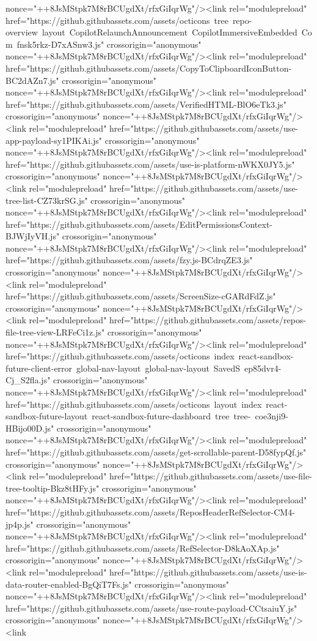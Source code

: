 nonce="++8JsMStpk7M8rBCUgdXt/rfxGiIqrWg"/><link rel="modulepreload" href="https://github.githubassets.com/assets/octicons~tree~repo-overview~layout~CopilotRelaunchAnnouncement~CopilotImmersiveEmbedded~Com~fnsk5rkz-D7xASnw3.js" crossorigin="anonymous" nonce="++8JsMStpk7M8rBCUgdXt/rfxGiIqrWg"/><link rel="modulepreload" href="https://github.githubassets.com/assets/CopyToClipboardIconButton-BC2dAZn7.js" crossorigin="anonymous" nonce="++8JsMStpk7M8rBCUgdXt/rfxGiIqrWg"/><link rel="modulepreload" href="https://github.githubassets.com/assets/VerifiedHTML-BlO6eTk3.js" crossorigin="anonymous" nonce="++8JsMStpk7M8rBCUgdXt/rfxGiIqrWg"/><link rel="modulepreload" href="https://github.githubassets.com/assets/use-app-payload-sy1PIKAi.js" crossorigin="anonymous" nonce="++8JsMStpk7M8rBCUgdXt/rfxGiIqrWg"/><link rel="modulepreload" href="https://github.githubassets.com/assets/use-is-platform-nWKX0JY5.js" crossorigin="anonymous" nonce="++8JsMStpk7M8rBCUgdXt/rfxGiIqrWg"/><link rel="modulepreload" href="https://github.githubassets.com/assets/use-tree-list-CZ73krSG.js" crossorigin="anonymous" nonce="++8JsMStpk7M8rBCUgdXt/rfxGiIqrWg"/><link rel="modulepreload" href="https://github.githubassets.com/assets/EditPermissionsContext-BJWjIyVH.js" crossorigin="anonymous" nonce="++8JsMStpk7M8rBCUgdXt/rfxGiIqrWg"/><link rel="modulepreload" href="https://github.githubassets.com/assets/fzy.js-BCdrqZE3.js" crossorigin="anonymous" nonce="++8JsMStpk7M8rBCUgdXt/rfxGiIqrWg"/><link rel="modulepreload" href="https://github.githubassets.com/assets/ScreenSize-cGARdFdZ.js" crossorigin="anonymous" nonce="++8JsMStpk7M8rBCUgdXt/rfxGiIqrWg"/><link rel="modulepreload" href="https://github.githubassets.com/assets/repos-file-tree-view-LRFeCi1z.js" crossorigin="anonymous" nonce="++8JsMStpk7M8rBCUgdXt/rfxGiIqrWg"/><link rel="modulepreload" href="https://github.githubassets.com/assets/octicons~index~react-sandbox-future-client-error~global-nav-layout~global-nav-layout~SavedS~ep85dvr4-Cj_S2fla.js" crossorigin="anonymous" nonce="++8JsMStpk7M8rBCUgdXt/rfxGiIqrWg"/><link rel="modulepreload" href="https://github.githubassets.com/assets/octicons~layout~index~react-sandbox-future-layout~react-sandbox-future-dashboard~tree~tree-~coe3nji9-HBijo00D.js" crossorigin="anonymous" nonce="++8JsMStpk7M8rBCUgdXt/rfxGiIqrWg"/><link rel="modulepreload" href="https://github.githubassets.com/assets/get-scrollable-parent-D58fypQf.js" crossorigin="anonymous" nonce="++8JsMStpk7M8rBCUgdXt/rfxGiIqrWg"/><link rel="modulepreload" href="https://github.githubassets.com/assets/use-file-tree-tooltip-Bkz8tHFy.js" crossorigin="anonymous" nonce="++8JsMStpk7M8rBCUgdXt/rfxGiIqrWg"/><link rel="modulepreload" href="https://github.githubassets.com/assets/ReposHeaderRefSelector-CM4-jp4p.js" crossorigin="anonymous" nonce="++8JsMStpk7M8rBCUgdXt/rfxGiIqrWg"/><link rel="modulepreload" href="https://github.githubassets.com/assets/RefSelector-D8kAoXAp.js" crossorigin="anonymous" nonce="++8JsMStpk7M8rBCUgdXt/rfxGiIqrWg"/><link rel="modulepreload" href="https://github.githubassets.com/assets/use-is-data-router-enabled-BgQiT7Fs.js" crossorigin="anonymous" nonce="++8JsMStpk7M8rBCUgdXt/rfxGiIqrWg"/><link rel="modulepreload" href="https://github.githubassets.com/assets/use-route-payload-CCtsaiuY.js" crossorigin="anonymous" nonce="++8JsMStpk7M8rBCUgdXt/rfxGiIqrWg"/><link 